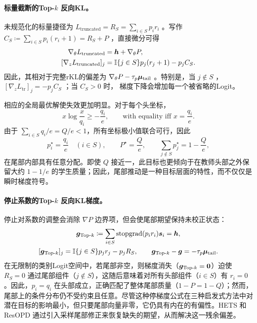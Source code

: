 \paragraph{标量截断的Top-$k$ 反向KL。}
未规范化的标量捷径为
$L_{\mathrm{truncated}}=R_S=\sum_{i\in S}p_i r_i$ 。写作
$C_S\coloneqq\sum_{i\in S}p_i(r_i+1)=R_S+P$ ，直接微分可得
\begin{equation}
 \begin{aligned}
 \nabla_\theta L_{\mathrm{truncated}}
 &=\bm{h}+\nabla_\theta P,\\
 [\nabla_z L_{\mathrm{truncated}}]_j
 &=\mathbb{I}\{j\in S\}p_j(r_j+1)-p_jC_S.
 \end{aligned}
 \label{eq:scalar-truncated-gradient}
\end{equation}
因此，其相对于完整rKL的偏差为
$\nabla_\theta P-\tau_p\bm{\mu}_{\mathrm{tail}}$ 。特别是，当
$j\notin S$ ，$[\nabla_z L_{\mathrm{tr}}]_j=-p_jC_S$ ；当 $C_S>0$ 时，
梯度下降会增加每一个被省略的Logit。

相应的全局最优解使失效更加明显。对于每个头坐标，
\begin{equation}
 x\log\frac{x}{q_i}\geq-\frac{q_i}{e},
 \qquad\text{with equality iff }x=\frac{q_i}{e}.
\end{equation}
由于 $\sum_{i\in S}q_i/e=Q/e<1$，所有坐标极小值联合可行，因此
\begin{equation}
 p_i^\star=\frac{q_i}{e}\quad(i\in S),\qquad
 P^\star=\frac{Q}{e},\qquad
 \sum_{j\notin S}p_j^\star=1-\frac{Q}{e},
 \label{eq:scalar-truncated-optimum}
\end{equation}
在尾部内部具有任意分配。即使 $Q$  接近一，此目标也更倾向于在教师头部之外保留大约 $1-1/e$  的学生质量；因此，尾部推动是一种目标层面的特性，而不仅仅是瞬时梯度符号。

\paragraph{停止系数的Top-$k$ 反向KL梯度。}
停止对系数的调整会消除 $\nabla P$ 边界项，但会使尾部期望保持未校正状态：
\begin{equation}
  \begin{gathered}
    \bgrad_{\text{Top-}k} \coloneqq \sum_{i \in S} \operatorname{stopgrad}(p_i r_i) \bscore_i = \bhead, \\
    [\bgrad_{\text{Top-}k}]_j = \ind\{j \in S\} p_j r_j - p_j R_S, \qquad
    \bgrad_{\text{Top-}k} - \bgrad = -\tau_p \bmean_{\mathrm{tail}}.
  \end{gathered}
  \label{eq:stopped-topk-gradient-bias}
\end{equation}
在无限制的类别Logit空间中，若尾部非空，则梯度消失（$\bm{g}_{\text{Top-}k} = \mathbf{0}$）迫使 $R_S = 0$ 通过尾部组件（$j \notin S$），这随后意味着对所有头部组件（$i \in S$）有 $r_i = 0$。因此，$p_i = q_i$ 在头部成立，正确匹配了整体尾部质量（$1 - P = 1 - Q$）；然而，尾部上的条件分布仍不受约束且任意。尽管这种停梯度公式在三种启发式方法中对潜在目标的影响最小，但只要尾部向量非零，它仍具有内在的有偏性。HETS 和 ResOPD 通过引入采样尾部修正来恢复缺失的期望，从而解决这一残余偏差。


